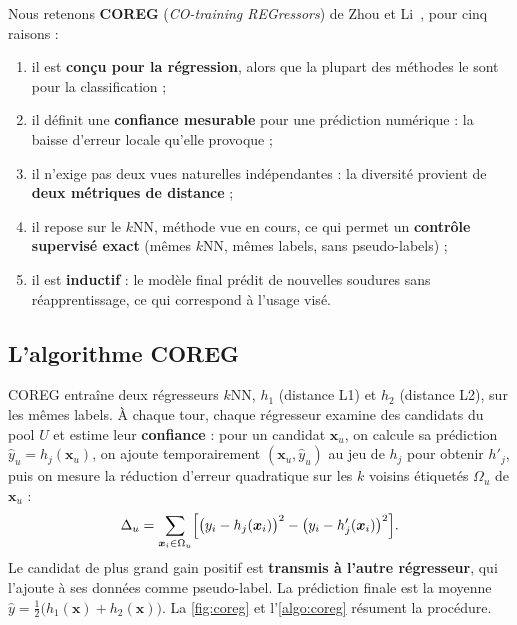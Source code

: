 \begin{decision}
Nous retenons \textbf{COREG} (\emph{CO-training REGressors}) de Zhou et
Li~\cite{zhou_li_2005}, pour cinq raisons :
\begin{enumerate}[leftmargin=1.5em]
  \item il est \textbf{conçu pour la régression}, alors que la plupart des méthodes le sont pour la classification ;
  \item il définit une \textbf{confiance mesurable} pour une prédiction numérique : la baisse d'erreur locale qu'elle provoque ;
  \item il n'exige pas deux vues naturelles indépendantes : la diversité provient de \textbf{deux métriques de distance} ;
  \item il repose sur le $k$NN, méthode vue en cours, ce qui permet un \textbf{contrôle supervisé exact} (mêmes $k$NN, mêmes labels, sans pseudo-labels) ;
  \item il est \textbf{inductif} : le modèle final prédit de nouvelles soudures sans réapprentissage, ce qui correspond à l'usage visé.
\end{enumerate}
\end{decision}

\subsection{L'algorithme COREG}
\label{subsec:coreg_algo}

COREG entraîne deux régresseurs $k$NN, $h_1$ (distance L1) et $h_2$ (distance L2),
sur les mêmes labels. À chaque tour, chaque régresseur examine des candidats du
pool $U$ et estime leur \textbf{confiance} : pour un candidat $\bm{x}_u$, on
calcule sa prédiction $\hat{y}_u = h_j(\bm{x}_u)$, on ajoute temporairement
$(\bm{x}_u, \hat{y}_u)$ au jeu de $h_j$ pour obtenir $h'_j$, puis on mesure la
réduction d'erreur quadratique sur les $k$ voisins étiquetés $\Omega_u$ de $\bm{x}_u$ :
\begin{equation}
  \Delta_u = \sum_{\bm{x}_i \in \Omega_u}\Bigl[\bigl(y_i - h_j(\bm{x}_i)\bigr)^2 - \bigl(y_i - h'_j(\bm{x}_i)\bigr)^2\Bigr].
  \label{eq:coreg_gain}
\end{equation}
Le candidat de plus grand gain positif est \textbf{transmis à l'autre régresseur},
qui l'ajoute à ses données comme pseudo-label. La prédiction finale est la
moyenne $\hat{y} = \tfrac{1}{2}\bigl(h_1(\bm{x}) + h_2(\bm{x})\bigr)$. La
\cref{fig:coreg} et l'\cref{algo:coreg} résument la procédure.

